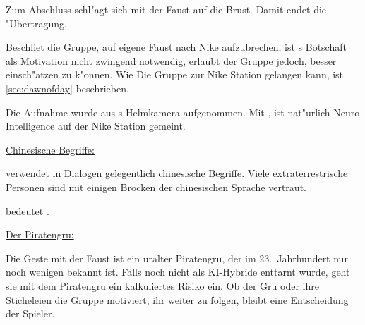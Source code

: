 
Zum Abschluss schl"agt \xl{} sich mit der Faust auf die Brust. Damit endet die "Ubertragung.

Beschlie\3t die Gruppe, auf eigene Faust nach Nike aufzubrechen, ist \xl{}s Botschaft als Motivation nicht zwingend notwendig, erlaubt der Gruppe jedoch, \xl{} besser einsch"atzen zu k"onnen. Wie Die Gruppe zur Nike Station gelangen kann, ist \cref{sec:dawnofday} beschrieben.
\vfill

\begin{remarks}
	Die Aufnahme wurde aus \ml{}s Helmkamera aufgenommen. Mit , ist nat"urlich Neuro Intelligence auf der Nike Station gemeint.

	\underline{Chinesische Begriffe:}

	\xl{} verwendet in Dialogen gelegentlich chinesische Begriffe. Viele extraterrestrische Personen sind mit einigen Brocken der chinesischen Sprache vertraut.
	
	 bedeutet .

	\underline{Der Piratengru\3:}

	Die Geste mit der Faust ist ein uralter Piratengru\3, der im 23.~Jahrhundert nur noch wenigen bekannt ist. Falls \xl{} noch nicht als KI-Hybride enttarnt wurde, geht sie mit dem Piratengru\3 ein kalkuliertes Risiko ein. Ob der Gru\3 oder ihre Sticheleien die Gruppe motiviert, ihr weiter zu folgen, bleibt eine Entscheidung der Spieler.
\end{remarks}	

